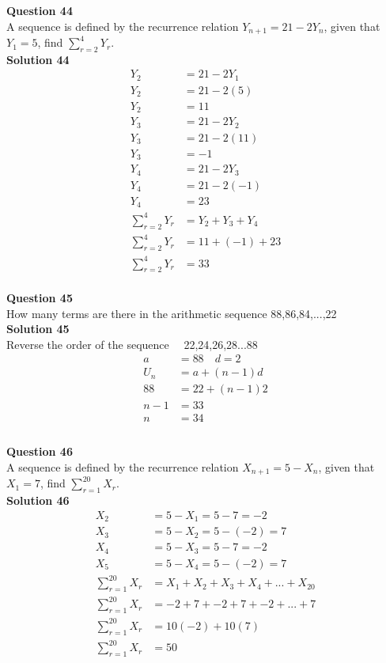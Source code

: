\documentclass{article}
\begin{document}
\noindent\textbf{Question 44}\\[5pt]
A sequence is defined by the recurrence relation $Y_{n+1}=21-2Y_n$, given that  $Y_1 =5$, find $\displaystyle\sum_{r=2}^{4} Y_r$.\\[5pt]
\noindent\textbf{Solution 44}\\[5pt]
\begin{align*}
Y_2&=21-2Y_1\\[2pt]
Y_2&=21-2(5)\\[2pt]
Y_2&=11\\[12pt]
Y_3&=21-2Y_2\\[2pt]
Y_3&=21-2(11)\\[2pt]
Y_3&=-1\\[12pt]
Y_4&=21-2Y_3\\[2pt]
Y_4&=21-2(-1)\\[2pt]
Y_4&=23\\[12pt]
\displaystyle\sum_{r=2}^{4} Y_r&=Y_2+Y_3+Y_4\\[2pt]
\displaystyle\sum_{r=2}^{4} Y_r&=11+(-1)+23\\[2pt]
\displaystyle\sum_{r=2}^{4} Y_r&=33
\end{align*}\\[10pt]

\noindent\textbf{Question 45}\\[5pt]
How many terms are there in the arithmetic sequence 88,86,84,...,22\\[5pt]
\noindent\textbf{Solution 45}\\[5pt]
Reverse the order of the sequence$\quad$ 22,24,26,28...88
\begin{align*}
a&=88 \quad d=2\\[2pt]
U_n&=a+(n-1)d\\[2pt]
88&=22+(n-1)2\\[2pt]
n-1&=33\\[2pt]
n&=34\\[-100pt]
\end{align*}\\[10pt]

\noindent\textbf{Question 46}\\[5pt]
A sequence is defined by the recurrence relation $X_{n+1}=5-X_n$, given that  $X_1 =7$, find $\displaystyle\sum_{r=1}^{20} X_r$.\\[5pt]
\noindent\textbf{Solution 46}\\[5pt]
\begin{align*}
X_2&=5-X_1=5-7=-2\\[7pt]
X_3&=5-X_2=5-(-2)=7\\[7pt]
X_4&=5-X_3=5-7=-2\\[7pt]
X_5&=5-X_4=5-(-2)=7\\[7pt]
\displaystyle\sum_{r=1}^{20} X_r &= X_1+X_2+X_3+X_4+...+X_{20}\\[2pt]
\displaystyle\sum_{r=1}^{20} X_r &= -2+7+-2+7+-2+...+7\\[2pt]
\displaystyle\sum_{r=1}^{20} X_r &= 10(-2)+10(7)\\[2pt]
\displaystyle\sum_{r=1}^{20} X_r &= 50\\[2pt]
\end{align*}\\[10pt]
\end{document}
